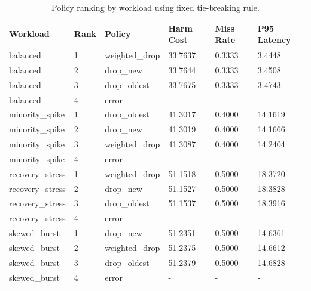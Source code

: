 \begin{table}[t]
\centering
\caption{Policy ranking by workload using fixed tie-breaking rule.}
\label{tab:policy_ranking}
\begin{tabular}{llllll}
\hline
Workload & Rank & Policy & Harm Cost & Miss Rate & P95 Latency \\
\hline
balanced & 1 & weighted\_drop & 33.7637 & 0.3333 & 3.4448 \\
balanced & 2 & drop\_new & 33.7644 & 0.3333 & 3.4508 \\
balanced & 3 & drop\_oldest & 33.7675 & 0.3333 & 3.4743 \\
balanced & 4 & error & - & - & - \\
minority\_spike & 1 & drop\_oldest & 41.3017 & 0.4000 & 14.1619 \\
minority\_spike & 2 & drop\_new & 41.3019 & 0.4000 & 14.1666 \\
minority\_spike & 3 & weighted\_drop & 41.3087 & 0.4000 & 14.2404 \\
minority\_spike & 4 & error & - & - & - \\
recovery\_stress & 1 & weighted\_drop & 51.1518 & 0.5000 & 18.3720 \\
recovery\_stress & 2 & drop\_new & 51.1527 & 0.5000 & 18.3828 \\
recovery\_stress & 3 & drop\_oldest & 51.1537 & 0.5000 & 18.3916 \\
recovery\_stress & 4 & error & - & - & - \\
skewed\_burst & 1 & drop\_new & 51.2351 & 0.5000 & 14.6361 \\
skewed\_burst & 2 & weighted\_drop & 51.2375 & 0.5000 & 14.6612 \\
skewed\_burst & 3 & drop\_oldest & 51.2379 & 0.5000 & 14.6828 \\
skewed\_burst & 4 & error & - & - & - \\
\hline
\end{tabular}
\end{table}
